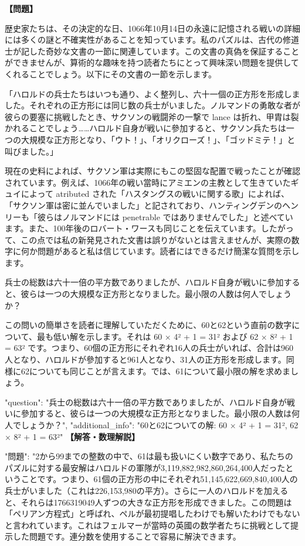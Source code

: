 \documentclass[10pt,a4paper,oneside,openany]{ltjsbook}
\begin{document}
\begin{tcolorbox}[colback=softblue,colframe=primaryblue,title=\textbf{第 129 問：THE BATTLE OF HASTINGS.},arc=2mm,boxrule=1pt,breakable]
\textbf{【問題】}\par\vspace{0.3em}
歴史家たちは、その決定的な日、1066年10月14日の永遠に記憶される戦いの詳細には多くの謎と不確実性があることを知っています。私のパズルは、古代の修道士が記した奇妙な文書の一節に関連しています。この文書の真偽を保証することができませんが、算術的な趣味を持つ読者たちにとって興味深い問題を提供してくれることでしょう。以下にその文書の一節を示します。

「ハロルドの兵士たちはいつも通り、よく整列し、六十一個の正方形を形成しました。それぞれの正方形には同じ数の兵士がいました。ノルマンドの勇敢な者が彼らの要塞に挑戦したとき、サクソンの戦闘斧の一撃で lance は折れ、甲胄は裂かれることでしょう……ハロルド自身が戦いに參加すると、サクソン兵たちは一つの大規模な正方形となり、「ウト！」、「オリクローズ！」、「ゴッドミテ！」と叫びました。」

現在の史料によれば、サクソン軍は実際にもこの堅固な配置で戦ったことが確認されています。例えば、1066年の戦い當時にアミエンの主教として生きていたギュイによって atributed された「ハスタングスの戦いに関する歌」によれば、「サクソン軍は密に並んでいました」と記されており、ハンティングデンのヘンリーも「彼らはノルマンドには penetrable ではありませんでした」と述べています。また、100年後のロバート・ワースも同じことを伝えています。したがって、この点では私の新発見された文書は誤りがないとは言えませんが、実際の数字に何か問題があると私は信じています。読者にはできるだけ簡潔な質問を示します。

兵士の総数は六十一倍の平方数でありましたが、ハロルド自身が戦いに參加すると、彼らは一つの大規模な正方形となりました。最小限の人数は何人でしょうか？

この問いの簡単さを読者に理解していただくために、60と62という直前の数字について、最も低い解を示します。それは 60 × 4² + 1 = 31² および 62 × 8² + 1 = 63² です。つまり、60個の正方形にそれぞれ16人の兵士がいれば、合計は960人となり、ハロルドが參加すると961人となり、31人の正方形を形成します。同様に62についても同じことが言えます。では、61について最小限の解を求めましょう。

{
  "question": "兵士の総数は六十一倍の平方数でありましたが、ハロルド自身が戦いに參加すると、彼らは一つの大規模な正方形となりました。最小限の人数は何人でしょうか？",
  "additional\_info": "60と62についての解: 60 × 4² + 1 = 31², 62 × 8² + 1 = 63²"
}
\tcblower
\textbf{【解答・数理解説】}\par\vspace{0.3em}
{
"問題": "2から99までの整数の中で、61は最も扱いにくい数字であり、私たちのパズルに対する最安解はハロルドの軍隊が3,119,882,982,860,264,400人だったということです。つまり、61個の正方形の中にそれぞれ51,145,622,669,840,400人の兵士がいました（これは226,153,980の平方）。さらに一人のハロルドを加えると、それらは1766319049人ずつの大きな正方形を形成できました。この問題は「ペリアン方程式」と呼ばれ、ペルが最初提唱したわけでも解いたわけでもないと言われています。これはフェルマーが當時の英國の数学者たちに挑戦として提示した問題です。連分数を使用することで容易に解決できます。

}
\end{tcolorbox}
\end{document}

